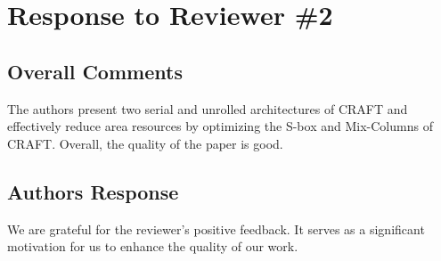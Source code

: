 \section{Response to Reviewer \#2}
\subsection*{Overall Comments}
The authors present two serial and unrolled architectures of CRAFT and effectively reduce area resources by optimizing the S-box and Mix-Columns of CRAFT. Overall, the quality of the paper is good.

\subsection{Authors Response} 

We are grateful for the reviewer's positive feedback. It serves as a significant motivation for us to enhance the quality of our work.


